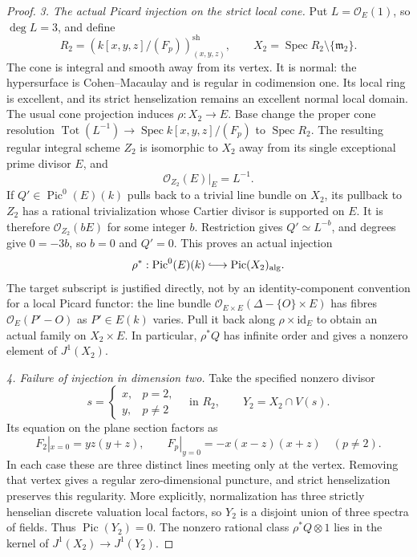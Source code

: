 \begin{proof}
\emph{3. The actual Picard injection on the strict local cone.}
Put $L=\mathcal O_E(1)$, so $\deg L=3$, and define
\[
 R_2=\left(k[x,y,z]/(F_p)\right)_{(x,y,z)}^{\mathrm{sh}},
 \qquad
 X_2=\operatorname{Spec}R_2\setminus\{\mathfrak m_2\}.
\]
The cone is integral and smooth away from its vertex.
It is normal: the hypersurface is Cohen--Macaulay and is
regular in codimension one. Its local ring is excellent,
and its strict henselization remains an excellent normal
local domain. The usual cone projection induces
$\rho:X_2\to E$. Base change the proper cone resolution
$\operatorname{Tot}(L^{-1})\to\operatorname{Spec}k[x,y,z]/(F_p)$
to $\operatorname{Spec}R_2$. The resulting regular integral
scheme $Z_2$ is isomorphic to $X_2$ away from its single
exceptional prime divisor $E$, and
\[
                     \mathcal O_{Z_2}(E)|_E=L^{-1}.
\]
If $Q'\in\operatorname{Pic}^0(E)(k)$ pulls back to a trivial
line bundle on $X_2$, its pullback to $Z_2$ has a rational
trivialization whose Cartier divisor is supported on $E$.
It is therefore $\mathcal O_{Z_2}(bE)$ for some integer $b$.
Restriction gives $Q'\simeq L^{-b}$, and degrees give
$0=-3b$, so $b=0$ and $Q'=0$. This proves an actual injection
\begin{equation}\label{eq:C3x-elliptic-injection}
 \rho^*:\operatorname{Pic}^0(E)(k)
       \lhook\joinrel\longrightarrow
       \operatorname{Pic}(X_2)_{\mathrm{alg}}.
\end{equation}
The target subscript is justified directly, not by an
identity-component convention for a local Picard functor:
the line bundle $\mathcal O_{E\times E}
(\Delta-\{O\}\times E)$ has fibres
$\mathcal O_E(P'-O)$ as $P'\in E(k)$ varies. Pull it back
along $\rho\times\mathrm{id}_E$ to obtain an actual family
on $X_2\times E$. In particular, $\rho^*Q$ has infinite
order and gives a nonzero element of $J^1(X_2)$.

\emph{4. Failure of injection in dimension two.}
Take the specified nonzero divisor
\[
 s=
 \begin{cases}x,&p=2,\\y,&p\ne2\end{cases}
 \quad\text{in }R_2,
 \qquad Y_2=X_2\cap V(s).
\]
Its equation on the plane section factors as
\[
 F_2|_{x=0}=yz(y+z),\qquad
 F_p|_{y=0}=-x(x-z)(x+z)\quad(p\ne2).
\]
In each case these are three distinct lines meeting only
at the vertex. Removing that vertex gives a regular
zero-dimensional puncture, and strict henselization
preserves this regularity. More explicitly, normalization
has three strictly henselian discrete valuation local
factors, so $Y_2$ is a disjoint union of three spectra
of fields. Thus $\operatorname{Pic}(Y_2)=0$.
The nonzero rational class $\rho^*Q\otimes1$ lies in the
kernel of $J^1(X_2)\to J^1(Y_2)$.


\end{proof}
